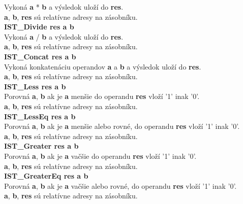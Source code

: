 \documentclass[12pt,a4paper,titlepage,final]{article}
\begin{document}
Vykoná \textbf{a} * \textbf{b} a výsledok uloží do \textbf{res}.\\
\textbf{a}, \textbf{b}, \textbf{res} sú relatívne adresy na zásobníku.\\
\textbf{IST\_Divide res a b}\\
Vykoná \textbf{a} / \textbf{b} a výsledok uloží do \textbf{res}.\\
\textbf{a}, \textbf{b}, \textbf{res} sú relatívne adresy na zásobníku.\\
\textbf{IST\_Concat res a b}\\
Vykoná konkatenáciu operandov \textbf{a} a \textbf{b} a výsledok uloží do \textbf{res}.\\
\textbf{a}, \textbf{b}, \textbf{res} sú relatívne adresy na zásobníku.\\
\textbf{IST\_Less res a b}\\
Porovná \textbf{a}, \textbf{b} ak je \textbf{a} menšie do operandu \textbf{res} vloží '1' inak '0'.\\
\textbf{a}, \textbf{b}, \textbf{res} sú relatívne adresy na zásobníku.\\
\textbf{IST\_LessEq res a b}\\
Porovná \textbf{a}, \textbf{b} ak je \textbf{a} menšie alebo rovné, do operandu \textbf{res} vloží '1' inak '0'.\\
\textbf{a}, \textbf{b}, \textbf{res} sú relatívne adresy na zásobníku.\\
\textbf{IST\_Greater res a b}\\
Porovná \textbf{a}, \textbf{b} ak je \textbf{a} vačšie do operandu \textbf{res} vloží '1' inak '0'.\\
\textbf{a}, \textbf{b}, \textbf{res} sú relatívne adresy na zásobníku.\\
\textbf{IST\_GreaterEq res a b}\\
Porovná \textbf{a}, \textbf{b} ak je \textbf{a} vačšie alebo rovné, do operandu \textbf{res} vloží '1' inak '0'.\\
\textbf{a}, \textbf{b}, \textbf{res} sú relatívne adresy na zásobníku.\\

\end{document}
